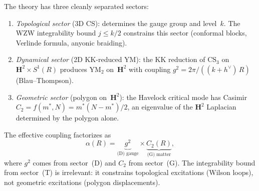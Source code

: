 \begin{derivation}\label{thm:gauge-matter}
The theory has three cleanly separated sectors:
\begin{enumerate}
\item[\emph{(T)}] \emph{Topological sector} (3D CS):
  determines the gauge group and level~$k$.
  The WZW integrability bound $j \le k/2$ constrains this sector
  (conformal blocks, Verlinde formula, anyonic braiding).
\item[\emph{(D)}] \emph{Dynamical sector} (2D KK-reduced YM):
  the KK reduction of $\mathrm{CS}_3$ on
  $\mathbf{H}^2 \times S^1(R)$ produces $\mathrm{YM}_2$
  on~$\mathbf{H}^2$ with coupling
  $g^2 = 2\pi/((k{+}h^\vee)\,R)$ (Blau--Thompson).
\item[\emph{(G)}] \emph{Geometric sector} (polygon on~$\mathbf{H}^2$):
  the Havelock critical mode has Casimir
  $C_2 = f(m^*,N) = m^*(N{-}m^*)/2$, an eigenvalue of the
  $\mathbf{H}^2$ Laplacian determined by the polygon alone.
\end{enumerate}
The effective coupling factorizes as
\begin{equation}\label{eq:gauge-matter}
  \alpha(R) = \underbrace{g^2}_{\text{(D) gauge}} \times
  \underbrace{C_2(R)}_{\text{(G) matter}},
\end{equation}
where $g^2$ comes from sector~(D) and $C_2$ from sector~(G).
The integrability bound from sector~(T) is irrelevant: it
constrains topological excitations (Wilson loops),
not geometric excitations (polygon displacements).
\end{derivation}

